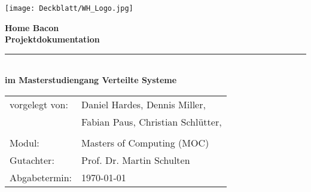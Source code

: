 \thispagestyle{plain}
\begin{titlepage}

\begin{center}

\texttt{[image: Deckblatt/WH\_Logo.jpg]}

\vspace{2cm}

\Huge{\textbf{Home Bacon}}\\[1.5ex]
\Large{\textbf{Projektdokumentation}}
\rule{\textwidth}{0.4pt}\\[3.0ex]

\large{\textbf{im Masterstudiengang Verteilte Systeme}}\\[3.0ex]

\normalsize
\begin{tabular}{ll}\\
	vorgelegt von: 
	& \quad Daniel Hardes,  Dennis Miller, \\[1.2ex]
	& \quad Fabian Paus, Christian Schlütter,\\[1.2ex]
	& \quad \\[1.2ex]
	Modul:  & \quad Masters of Computing (MOC) \\[1.2ex]
	Gutachter:  & \quad Prof. Dr. Martin Schulten \\[1.2ex]
	Abgabetermin:  & \quad \today\\[1.2ex]
\end{tabular}

\end{center}

\end{titlepage}
